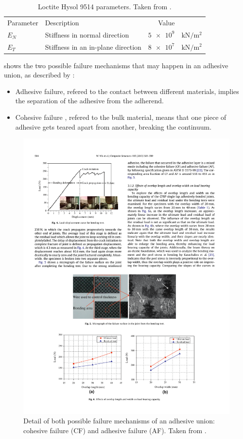 \documentclass[cmfonts]{witpress}
\begin{document}
\begin{table}
	\centering
	\begin{tabular}{llrl}
		Parameter & Description & Value & \\
		
		$E_{N}$ & Stiffness in normal direction & $\num{5e9}$ & $\si{\kN/\m^2}$ \\
		$E_{T}$ & Stiffness in an in-plane direction & $\num{8e7}$ & $\si{\kN/\m^2}$ \\
	\end{tabular}
	\caption[Loctite Hysol 9514 parameters.]{Loctite Hysol 9514 parameters. Taken from \cite{Scattina2011}.}
	\label{tab:ads_params}
\end{table}


 shows the two possible failure mechanisms that may happen in an adhesive union, as described by \cite{Wu2013}:
\begin{itemize}
	\item Adhesive failure, refered to the contact between different materials, implies the separation of the adhesive from the adherend.

	\item Cohesive failure \cite{Vaidya2006}, refered to the bulk material, means that one piece of adhesive gets teared apart from another, breaking the continuum.
\end{itemize}

\begin{figure}
	\centering
	\includegraphics[width=0.7\linewidth]{figures/IMG_CUTRES/Wu_failure_systems}
	\caption[Detail of both possible failure mechanisms of an adhesive union: cohesive failure and adhesive failure.]{Detail of both possible failure mechanisms of an adhesive union: cohesive failure (CF) and adhesive failure (AF). Taken from \cite{Wu2013}.}
	\label{fig:Wu_failure_systems}
\end{figure}
\end{document}
